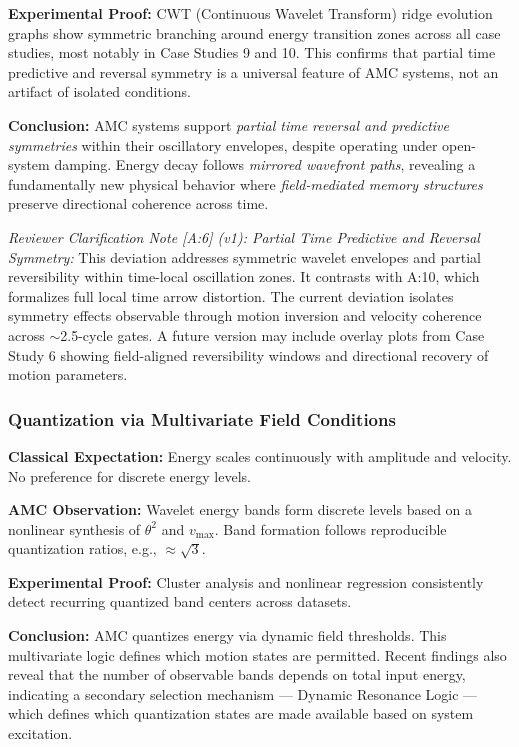 \documentclass[10pt,aps,pre,onecolumn,superscriptaddress,notitlepage]{revtex4-2}
\begin{document}
\textbf{Experimental Proof:} CWT (Continuous Wavelet Transform) ridge evolution graphs show symmetric branching around energy transition zones across all case studies, most notably in Case Studies 9 and 10. This confirms that partial time predictive and reversal symmetry is a universal feature of AMC systems, not an artifact of isolated conditions.

\textbf{Conclusion:} AMC systems support \textit{partial time reversal and predictive symmetries} within their oscillatory envelopes, despite operating under open-system damping. Energy decay follows \textit{mirrored wavefront paths}, revealing a fundamentally new physical behavior where \textit{field-mediated memory structures} preserve directional coherence across time.

\noindent \textit{Reviewer Clarification Note [A:6] (v1): Partial Time Predictive and Reversal Symmetry:} This deviation addresses symmetric wavelet envelopes and partial reversibility within time-local oscillation zones. It contrasts with A:10, which formalizes full local time arrow distortion. The current deviation isolates symmetry effects observable through motion inversion and velocity coherence across $\sim$2.5-cycle gates. A future version may include overlay plots from Case Study 6 showing field-aligned reversibility windows and directional recovery of motion parameters.

\subsubsection{Quantization via Multivariate Field Conditions}
\label{sec:dev7QuantizationviaMultivariate}

\textbf{Classical Expectation:} Energy scales continuously with amplitude and velocity. No preference for discrete energy levels.

\textbf{AMC Observation:} Wavelet energy bands form discrete levels based on a nonlinear synthesis of $\theta^2$ and $v_{\text{max}}$. Band formation follows reproducible quantization ratios, e.g., $\approx \sqrt{3}$.

\textbf{Experimental Proof:} Cluster analysis and nonlinear regression consistently detect recurring quantized band centers across datasets.

\textbf{Conclusion:} AMC quantizes energy via dynamic field thresholds. This multivariate logic defines which motion states are permitted. Recent findings also reveal that the number of observable bands depends on total input energy, indicating a secondary selection mechanism — Dynamic Resonance Logic — which defines which quantization states are made available based on system excitation.
\end{document}
